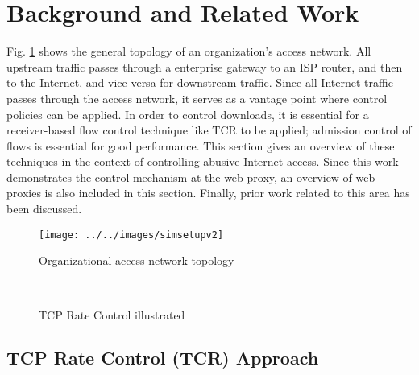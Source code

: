\documentclass[conference]{../../IEEEtran}
\begin{document}
\section{Background and Related Work}
\label{sec:back}
Fig. \ref{fig:simsetup} shows the general topology of an organization's  access network. All upstream traffic passes through a enterprise gateway to an ISP router, and then to the Internet, and vice versa for downstream traffic. Since all Internet traffic passes through the access network, it serves as a vantage point where control policies can be applied. In order to control downloads, it is essential for a receiver-based flow control technique like TCR to be applied; admission control of flows is essential for good performance. This section gives an overview of these techniques in the context of controlling abusive Internet access. Since this work demonstrates the control mechanism at the web proxy, an overview of web proxies is also included in this section. Finally, prior work related to this area has been discussed.

\begin{figure}[hbt]
\centering
\texttt{[image: ../../images/simsetupv2]}
\caption{Organizational access network topology}
\label{fig:simsetup}
\end{figure}
	\begin{figure}[hbt]
		\begin{center}
		\\ %
		\caption{TCP Rate Control illustrated}
		\label{fig:tcr}
		\end{center}
	\end{figure}
	
\subsection{TCP Rate Control (TCR) Approach}
\end{document}
